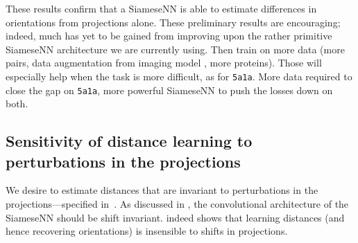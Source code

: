 These results confirm that a SiameseNN is able to estimate differences in orientations from projections alone.
These preliminary results are encouraging; indeed, much has yet to be gained from improving upon the rather primitive SiameseNN architecture we are currently using.
Then train on more data (more pairs, data augmentation from imaging model , more proteins).
Those will especially help when the task is more difficult, as for \texttt{5a1a}.
More data required to close the gap on \texttt{5a1a}, more powerful SiameseNN to push the losses down on both.


\subsection{Sensitivity of distance learning to perturbations in the projections}\label{sec:results:distance-estimation:sensitivity}

 


We desire to estimate distances that are invariant to perturbations in the projections---specified in~.
As discussed in , the convolutional architecture of the SiameseNN should be shift invariant.
 indeed shows that learning distances (and hence recovering orientations) is insensible to shifts in projections.

